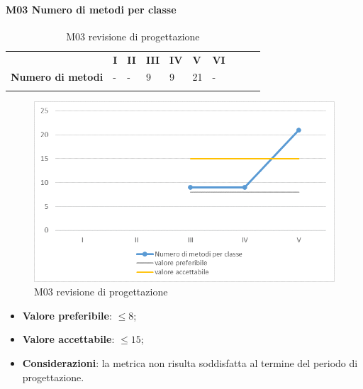 \paragraph{M03 Numero di metodi per classe} \mbox{}
\begin{longtable}[H!] {						
		>{}p{50mm}  		
		>{}p{8mm}
		>{}p{8mm}		
		>{}p{8mm}		
		>{}p{8mm}		
		>{}p{8mm}		
		>{}p{8mm}
		>{}p{8mm}
		>{}p{8mm}
		>{}p{8mm}
	}
	\rowcolor{gray!50}
	\textbf{} & \textbf{I} & \textbf{II} & \textbf{III} & \textbf{IV} & \textbf{V} & \textbf{VI} \TBstrut \\ [2mm]
	\textbf{Numero di metodi} & - & - & 9 & 9 & 21 & - \TBstrut \\ [2mm]
	\rowcolor{white}
	\caption{M03 revisione di progettazione}
\end{longtable}
\begin{figure}[H] 	
\includegraphics[width=\linewidth]{./img/grafici/RP3.png}	
\caption{M03 revisione di progettazione}	
\end{figure}
\begin{itemize}
	\item \textbf{Valore preferibile}: $\le8$;
	\item \textbf{Valore accettabile}: $\le15$;
	\item \textbf{Considerazioni}: la metrica non risulta soddisfatta al termine del periodo di progettazione.
\end{itemize}

